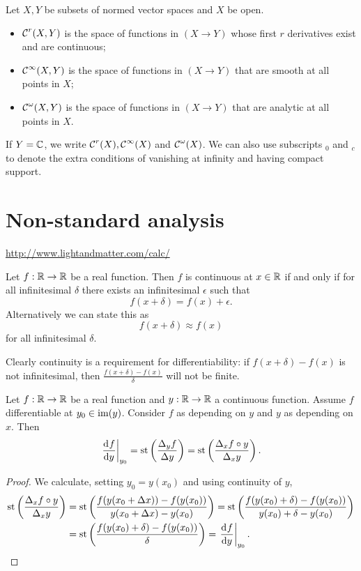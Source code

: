 \begin{definition}
Let $X,Y$ be subsets of normed vector spaces and $X$ be open.
\begin{itemize}
\item $\operatorname{\mathcal{C}}^r(X,Y)$ is the space of functions in $(X \to Y)$ whose first $r$ derivatives exist and are continuous;
\item $\operatorname{\mathcal{C}}^\infty(X,Y)$ is the space of functions in $(X \to Y)$ that are smooth at all points in $X$;
\item $\operatorname{\mathcal{C}}^\omega(X,Y)$ is the space of functions in $(X \to Y)$ that are analytic at all points in $X$.
\end{itemize}
If $Y = \mathbb{C}$, we write $\operatorname{\mathcal{C}}^r(X), \operatorname{\mathcal{C}}^\infty(X)$ and $\operatorname{\mathcal{C}}^\omega(X)$. We can also use subscripts $_0$ and $_c$ to denote the extra conditions of vanishing at infinity and having compact support.
\end{definition}



\chapter{Non-standard analysis}
\url{http://www.lightandmatter.com/calc/}

\begin{proposition}
Let $f:\mathbb{R}\to\mathbb{R}$ be a real function. Then $f$ is continuous at $x\in\mathbb{R}$ \textup{if and only if} for all infinitesimal $\delta$ there exists an infinitesimal $\epsilon$ such that
\[ f(x+\delta) = f(x) + \epsilon. \]
Alternatively we can state this as
\[ f(x+\delta) \approx f(x) \]
for all infinitesimal $\delta$.
\end{proposition}

Clearly continuity is a requirement for differentiability: if $f(x+\delta) - f(x)$ is not infinitesimal, then $\frac{f(x+\delta) - f(x)}{\delta}$ will not be finite.

\begin{lemma} \label{chainLemma}
Let $f:\mathbb{R}\to\mathbb{R}$ be a real function and $y:\mathbb{R}\to\mathbb{R}$ a continuous function. Assume $f$ differentiable at $y_0\in\operatorname{im}(y)$. Consider $f$ as depending on $y$ and $y$ as depending on $x$. Then
\[ \left.\mathinner{ \dfrac{\operatorname{d \!}{^{}}f}{\operatorname{d \!}{{y}^{}}} }\right|_{y_0} = \operatorname{st}\left(\frac{\Delta_y f}{\Delta y}\right) = \operatorname{st}\left(\frac{\Delta_x f\circ y}{\Delta_x y}\right). \]
\end{lemma}
\begin{proof}
We calculate, setting $y_0 = y(x_0)$ and using continuity of $y$,
\begin{align*}
\operatorname{st}\left(\frac{\Delta_x f\circ y}{\Delta_x y}\right) &= \operatorname{st}\left(\frac{f(y(x_0+\Delta x)) -f(y(x_0))}{y(x_0+\Delta x) - y(x_0)}\right) = \operatorname{st}\left(\frac{f(y(x_0)+\delta) -f(y(x_0))}{y(x_0)+\delta - y(x_0)}\right) \\
&= \operatorname{st}\left(\frac{f(y(x_0)+\delta) -f(y(x_0))}{\delta}\right) = \left.\mathinner{ \dfrac{\operatorname{d \!}{^{}}f}{\operatorname{d \!}{{y}^{}}} }\right|_{y_0}.
\end{align*}
\end{proof}

